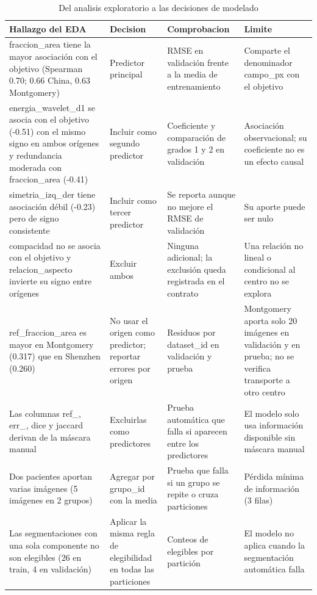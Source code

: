 \begin{table}[H]
\centering
\small
\caption{Del analisis exploratorio a las decisiones de modelado}
\begin{tabular}{p{3.6cm}p{2.8cm}p{3.4cm}p{3.4cm}}
\toprule
\textbf{Hallazgo del EDA} & \textbf{Decision} & \textbf{Comprobacion} & \textbf{Limite} \\
\midrule
fraccion\_area tiene la mayor asociación con el objetivo (Spearman 0.70; 0.66 China, 0.63 Montgomery) & Predictor principal & RMSE en validación frente a la media de entrenamiento & Comparte el denominador campo\_px con el objetivo \\
energia\_wavelet\_d1 se asocia con el objetivo (-0.51) con el mismo signo en ambos orígenes y redundancia moderada con fraccion\_area (-0.41) & Incluir como segundo predictor & Coeficiente y comparación de grados 1 y 2 en validación & Asociación observacional; su coeficiente no es un efecto causal \\
simetria\_izq\_der tiene asociación débil (-0.23) pero de signo consistente & Incluir como tercer predictor & Se reporta aunque no mejore el RMSE de validación & Su aporte puede ser nulo \\
compacidad no se asocia con el objetivo y relacion\_aspecto invierte su signo entre orígenes & Excluir ambos & Ninguna adicional; la exclusión queda registrada en el contrato & Una relación no lineal o condicional al centro no se explora \\
ref\_fraccion\_area es mayor en Montgomery (0.317) que en Shenzhen (0.260) & No usar el origen como predictor; reportar errores por origen & Residuos por dataset\_id en validación y prueba & Montgomery aporta solo 20 imágenes en validación y en prueba; no se verifica transporte a otro centro \\
Las columnas ref\_, err\_, dice y jaccard derivan de la máscara manual & Excluirlas como predictores & Prueba automática que falla si aparecen entre los predictores & El modelo solo usa información disponible sin máscara manual \\
Dos pacientes aportan varias imágenes (5 imágenes en 2 grupos) & Agregar por grupo\_id con la media & Prueba que falla si un grupo se repite o cruza particiones & Pérdida mínima de información (3 filas) \\
Las segmentaciones con una sola componente no son elegibles (26 en train, 4 en validación) & Aplicar la misma regla de elegibilidad en todas las particiones & Conteos de elegibles por partición & El modelo no aplica cuando la segmentación automática falla \\
\bottomrule
\end{tabular}
\end{table}

